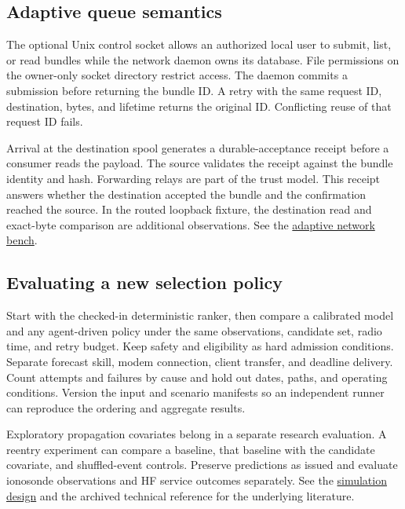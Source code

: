 \documentclass[11pt,a4paper]{article}
\newcommand{\repolink}[2]{\href{https://github.com/8r4n/linkwise/blob/main/#1}{#2}}
\begin{document}
\subsection{Adaptive queue semantics}

The optional Unix control socket allows an authorized local user to submit,
list, or read bundles while the network daemon owns its database. File
permissions on the owner-only socket directory restrict access. The daemon
commits a submission before returning the bundle ID. A retry with the same
request ID, destination, bytes, and lifetime returns the original ID.
Conflicting reuse of that request ID fails.

Arrival at the destination spool generates a durable-acceptance receipt
before a consumer reads the payload. The source validates the receipt
against the bundle identity and hash. Forwarding relays are part of the
trust model. This receipt answers whether the destination accepted the
bundle and the confirmation reached the source. In the routed loopback
fixture, the destination read and exact-byte comparison are additional
observations. See the \repolink{rust/network/README.md}{adaptive network
bench}.

\subsection{Evaluating a new selection policy}

Start with the checked-in deterministic ranker, then compare a calibrated
model and any agent-driven policy under the same observations, candidate
set, radio time, and retry budget. Keep safety and eligibility as hard
admission conditions. Separate forecast skill, modem connection, client
transfer, and deadline delivery. Count attempts and failures by cause and
hold out dates, paths, and operating conditions. Version the input and
scenario manifests so an independent runner can reproduce the ordering
and aggregate results.

Exploratory propagation covariates belong in a separate research
evaluation. A reentry experiment can compare a baseline, that baseline
with the candidate covariate, and shuffled-event controls. Preserve
predictions as issued and evaluate ionosonde observations and HF service
outcomes separately. See the
\repolink{docs/architecture/rf-agent-simulation-design.md}{simulation design}
and the archived technical reference for the underlying literature.


\end{document}
